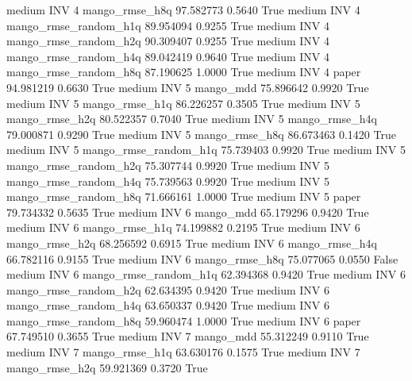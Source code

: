     medium      INV                 4        mango_rmse_h8q  97.582773      0.5640    True
    medium      INV                 4 mango_rmse_random_h1q  89.954094      0.9255    True
    medium      INV                 4 mango_rmse_random_h2q  90.309407      0.9255    True
    medium      INV                 4 mango_rmse_random_h4q  89.042419      0.9640    True
    medium      INV                 4 mango_rmse_random_h8q  87.190625      1.0000    True
    medium      INV                 4                 paper  94.981219      0.6630    True
    medium      INV                 5             mango_mdd  75.896642      0.9920    True
    medium      INV                 5        mango_rmse_h1q  86.226257      0.3505    True
    medium      INV                 5        mango_rmse_h2q  80.522357      0.7040    True
    medium      INV                 5        mango_rmse_h4q  79.000871      0.9290    True
    medium      INV                 5        mango_rmse_h8q  86.673463      0.1420    True
    medium      INV                 5 mango_rmse_random_h1q  75.739403      0.9920    True
    medium      INV                 5 mango_rmse_random_h2q  75.307744      0.9920    True
    medium      INV                 5 mango_rmse_random_h4q  75.739563      0.9920    True
    medium      INV                 5 mango_rmse_random_h8q  71.666161      1.0000    True
    medium      INV                 5                 paper  79.734332      0.5635    True
    medium      INV                 6             mango_mdd  65.179296      0.9420    True
    medium      INV                 6        mango_rmse_h1q  74.199882      0.2195    True
    medium      INV                 6        mango_rmse_h2q  68.256592      0.6915    True
    medium      INV                 6        mango_rmse_h4q  66.782116      0.9155    True
    medium      INV                 6        mango_rmse_h8q  75.077065      0.0550   False
    medium      INV                 6 mango_rmse_random_h1q  62.394368      0.9420    True
    medium      INV                 6 mango_rmse_random_h2q  62.634395      0.9420    True
    medium      INV                 6 mango_rmse_random_h4q  63.650337      0.9420    True
    medium      INV                 6 mango_rmse_random_h8q  59.960474      1.0000    True
    medium      INV                 6                 paper  67.749510      0.3655    True
    medium      INV                 7             mango_mdd  55.312249      0.9110    True
    medium      INV                 7        mango_rmse_h1q  63.630176      0.1575    True
    medium      INV                 7        mango_rmse_h2q  59.921369      0.3720    True
